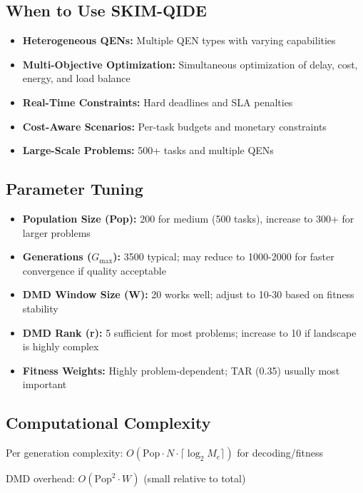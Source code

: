 \documentclass[12pt,a4paper]{article}
\begin{document}
\subsection{When to Use SKIM-QIDE}

\begin{itemize}
  \item \textbf{Heterogeneous QENs:} Multiple QEN types with varying capabilities
  \item \textbf{Multi-Objective Optimization:} Simultaneous optimization of delay, cost, energy, and load balance
  \item \textbf{Real-Time Constraints:} Hard deadlines and SLA penalties
  \item \textbf{Cost-Aware Scenarios:} Per-task budgets and monetary constraints
  \item \textbf{Large-Scale Problems:} 500+ tasks and multiple QENs
\end{itemize}

\subsection{Parameter Tuning}

\begin{itemize}
  \item \textbf{Population Size (Pop):} 200 for medium (500 tasks), increase to 300+ for larger problems
  \item \textbf{Generations ($G_{\max}$):} 3500 typical; may reduce to 1000-2000 for faster convergence if quality acceptable
  \item \textbf{DMD Window Size (W):} 20 works well; adjust to 10-30 based on fitness stability
  \item \textbf{DMD Rank (r):} 5 sufficient for most problems; increase to 10 if landscape is highly complex
  \item \textbf{Fitness Weights:} Highly problem-dependent; TAR (0.35) usually most important
\end{itemize}

\subsection{Computational Complexity}

Per generation complexity: $O(\mathrm{Pop} \cdot N \cdot \lceil \log_2 M_e \rceil)$ for decoding/fitness

DMD overhead: $O(\mathrm{Pop}^2 \cdot W)$ (small relative to total)
\end{document}
